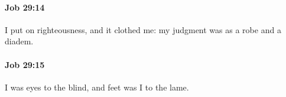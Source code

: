 		\paragraph{Job 29:14} %
			\label{JOB-29-14}

			I put on righteousness, and it clothed me: my judgment was as a robe and a diadem.


		\paragraph{Job 29:15} %
			\label{JOB-29-15}

			I was eyes to the blind, and feet was I to the lame.


